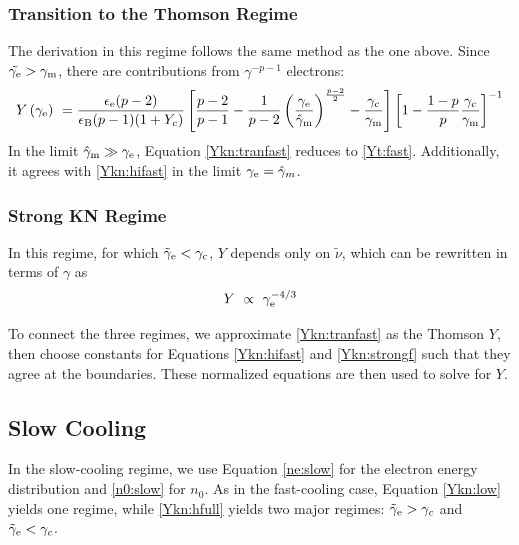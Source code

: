 \documentclass[fleqn,usenatbib]{mnras}
\begin{document}
\subsubsection{Transition to the Thomson Regime}

The derivation in this regime follows the same method as the one above. Since $\tilde{\gamma_{\rm e}} > \gamma_{\rm m}$, there are contributions from $\gamma^{-p-1}$ electrons:
\begin{equation}
\label{Ykn:tranfast}
    Y\left(\gamma_{\rm e}\right) \ = \frac{\epsilon_{\rm e} (p-2)}{\epsilon_{\rm B} (p-1)(1+Y_c)} \left[\frac{p-2}{p-1}-\frac{1}{p-2}\left(\frac{\gamma_{\rm e}}{\hat{\gamma}_{\rm m}}\right)^{\frac{p-2}{2}}-\frac{\gamma_{\rm c}}{\gamma_{\rm m}}\right]\left[1-\frac{1-p}{p}\frac{\gamma_{\rm c}}{\gamma_{\rm m}}\right]^{-1}
\end{equation}
In the limit $\hat{\gamma}_{\rm m} \gg \gamma_{\rm e}$, Equation \ref{Ykn:tranfast} reduces to \ref{Yt:fast}. Additionally, it agrees with \ref{Ykn:hifast} in the limit $\gamma_{\rm e} = \hat{\gamma}_{m}$.

\subsubsection{Strong KN Regime}

In this regime, for which $\tilde{\gamma}_{\rm{e}} < \gamma_{\rm{c}}$, $Y$ depends only on $\tilde{\nu}$, which can be rewritten in terms of $\gamma$ as
\begin{equation}
\label{Ykn:strongf}
    Y \ \propto \ \gamma_{\rm e}^{-4/3}
\end{equation}

To connect the three regimes, we approximate \ref{Ykn:tranfast} as the Thomson $Y$, then choose constants for Equations \ref{Ykn:hifast} and \ref{Ykn:strongf} such that they agree at the boundaries. These normalized equations are then used to solve for $Y$.

\subsection{Slow Cooling}

In the slow-cooling regime, we use Equation \ref{ne:slow} for the electron energy distribution and \ref{n0:slow} for $n_0$. As in the fast-cooling case, Equation \ref{Ykn:low} yields one regime, while \ref{Ykn:hfull} yields two major regimes: $\tilde{\gamma}_{\rm e} > \gamma_{c}$ and $\tilde{\gamma}_{\rm e} < \gamma_{c}$.
\end{document}
